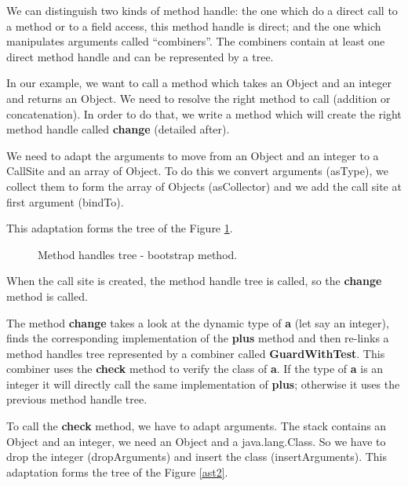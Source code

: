 \documentclass{sig-alternate}
\begin{document}
      We can distinguish two kinds of method handle:
      the one which do a direct call to a method or to a field access, this method handle is direct;
      and the one which manipulates arguments called ``combiners''.
      The combiners contain at least one direct method handle and can be represented by a tree.

      In our example, we want to call a method which takes an Object and an integer and returns an Object.
      We need to resolve the right method to call (addition or concatenation).
      In order to do that, we write a method which will create the right method handle called {\bf change} (detailed after).

      We need to adapt the arguments to move from an Object and an integer to a CallSite and an array of Object.
      To do this we convert arguments (asType), we collect them to form the array of Objects (asCollector) and we add the call site at first argument (bindTo).

      

      \noindent This adaptation forms the tree of the Figure \ref{ast1}.

      \begin{figure}[!h]
        \centering \resizebox{.7\linewidth}{!}{}
        \caption{Method handles tree - bootstrap method.}
        \label{ast1}
      \end{figure}

      When the call site is created, the method handle tree is called, so the {\bf change} method is called.

      

      The method {\bf change} takes a look at the dynamic type of {\bf a} (let say an integer),
      finds the corresponding implementation of the {\bf plus} method
      and then re-links a method handles tree represented by a combiner called {\bf GuardWithTest}.
      This combiner uses the {\bf check} method to verify the class of {\bf a}.
      If the type of {\bf a} is an integer it will directly call the same implementation of {\bf plus};
      otherwise it uses the previous method handle tree.

      To call the {\bf check} method, we have to adapt arguments.
      The stack contains an Object and an integer, we need an Object and a java.lang.Class.
      So we have to drop the integer (dropArguments) and insert the class (insertArguments).
      This adaptation forms the tree of the Figure \ref{ast2}.
\end{document}
